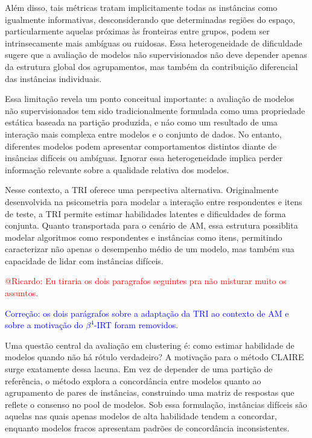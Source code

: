 Além disso, tais métricas tratam implicitamente todas as instâncias como igualmente informativas, desconsiderando que determinadas regiões do espaço, particularmente aquelas próximas às fronteiras entre grupos, podem ser intrinsecamente mais ambíguas ou ruidosas. Essa heterogeneidade de dificuldade sugere que a avaliação de modelos não supervisionados não deve depender apenas da estrutura global dos agrupamentos, mas também da contribuição diferencial das instâncias individuais.

Essa limitação revela um ponto conceitual importante: a avaliação de modelos não supervisionados tem sido tradicionalmente formulada como uma propriedade estática baseada na partição produzida, e náo como um resultado de uma interação mais complexa entre modelos e o conjunto de dados. No entanto, diferentes modelos podem apresentar comportamentos distintos diante de insâncias difíceis ou ambíguas. Ignorar essa heterogeneidade implica perder informação relevante sobre a qualidade relativa dos modelos.

Nesse contexto, a \gls{TRI} oferece uma perspectiva alternativa. Originalmente desenvolvida na psicometria para modelar a interação entre respondentes e itens de teste, a \gls{TRI} permite estimar habilidades latentes e dificuldades de forma conjunta. Quanto transportada para o cenário de \gls{AM}, essa estrutura possiblita modelar algoritmos como respondentes e instâncias como itens, permitindo caracterizar não apenas o desempenho médio de um modelo, mas também sua capacidade de lidar com instâncias difíceis.

\textcolor{red}{@Ricardo: Eu tiraria os dois paragrafos seguintes pra não misturar muito os assuntos.}

\textcolor{blue}{Correção: os dois parágrafos sobre a adaptação da TRI ao contexto de AM e sobre a motivação do $\beta^4$-\gls{IRT} foram removidos.}

Uma questão central da avaliação em clustering é: como estimar habilidade de modelos quando não há rótulo verdadeiro? A motivação para o método \gls{CLAIRE} surge exatamente dessa lacuna. Em vez de depender de uma partição de referência, o método explora a concordância entre modelos quanto ao agrupamento de pares de instâncias, construindo uma matriz de respostas que reflete o consenso no pool de modelos. Sob essa formulação, instâncias difíceis são aquelas nas quais apenas modelos de alta habilidade tendem a concordar, enquanto modelos fracos apresentam padrões de concordância inconsistentes.

